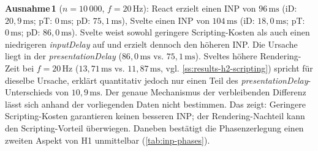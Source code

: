 \noindent\textbf{Ausnahme\,1} ($n = 10\,000$, $f = 20\,\text{Hz}$): React erzielt einen INP von $96\,\text{ms}$ (iD: $20{,}9\,\text{ms}$; pT: $0\,\text{ms}$; pD: $75{,}1\,\text{ms}$), Svelte einen INP von $104\,\text{ms}$ (iD: $18{,}0\,\text{ms}$; pT: $0\,\text{ms}$; pD: $86{,}0\,\text{ms}$). Svelte weist sowohl geringere Scripting-Kosten als auch einen niedrigeren \textit{inputDelay} auf und erzielt dennoch den höheren INP. Die Ursache liegt in der \textit{presentationDelay} ($86{,}0\,\text{ms}$ vs. $75{,}1\,\text{ms}$). Sveltes höhere Rendering-Zeit bei $f = 20\,\text{Hz}$ ($13{,}71\,\text{ms}$ vs. $11{,}87\,\text{ms}$, vgl. \cref{ss:results-h2-scripting}) spricht für dieselbe Ursache, erklärt quantitativ jedoch nur einen Teil des \textit{presentationDelay}-Unterschieds von $10{,}9\,\text{ms}$. Der genaue Mechanismus der verbleibenden Differenz lässt sich anhand der vorliegenden Daten nicht bestimmen. Das zeigt: Geringere Scripting-Kosten garantieren keinen besseren INP; der Rendering-Nachteil kann den Scripting-Vorteil überwiegen. Daneben bestätigt die Phasenzerlegung einen zweiten Aspekt von H1 unmittelbar (\cref{tab:inp-phases}). 

